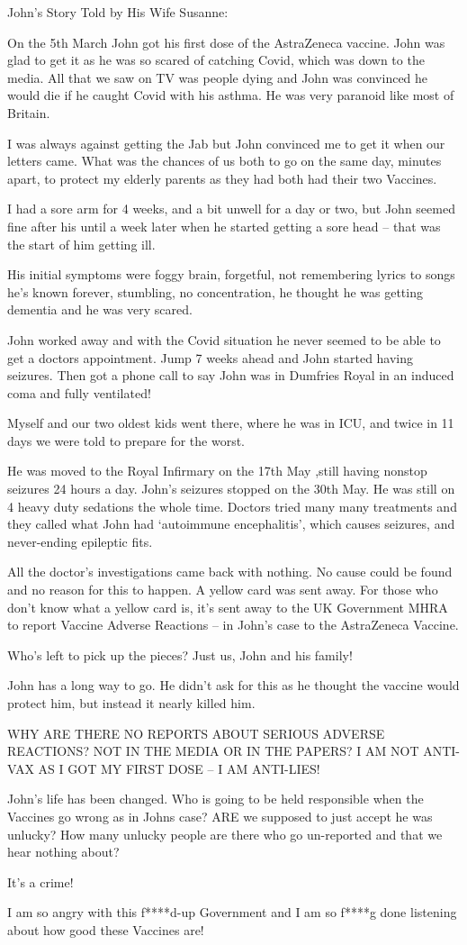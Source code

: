 John’s Story Told by His Wife Susanne:

On the 5th March John got his first dose of the AstraZeneca vaccine. John was
glad to get it as he was so scared of catching Covid, which was down to the
media. All that we saw on TV was people dying and John was convinced he would
die if he caught Covid with his asthma. He was very paranoid like most of
Britain.

I was always against getting the Jab but John convinced me to get it when our
letters came. What was the chances of us both to go on the same day, minutes
apart, to protect my elderly parents as they had both had their two Vaccines.

I had a sore arm for 4 weeks, and a bit unwell for a day or two, but John seemed
fine after his until a week later when he started getting a sore head – that was
the start of him getting ill.

His initial symptoms were foggy brain, forgetful, not remembering lyrics to
songs he’s known forever, stumbling, no concentration, he thought he was getting
dementia and he was very scared.

John worked away and with the Covid situation he never seemed to be able to get
a doctors appointment. Jump 7 weeks ahead and John started having seizures. Then
got a phone call to say John was in Dumfries Royal in an induced coma and fully
ventilated!

Myself and our two oldest kids went there, where he was in ICU, and twice in 11
days we were told to prepare for the worst.

He was moved to the Royal Infirmary on the 17th May ,still having nonstop
seizures 24 hours a day. John’s seizures stopped on the 30th May. He was still
on 4 heavy duty sedations the whole time. Doctors tried many many treatments and
they called what John had ‘autoimmune encephalitis’, which causes seizures, and
never-ending epileptic fits.

All the doctor’s investigations came back with nothing. No cause could be found
and no reason for this to happen. A yellow card was sent away. For those who
don’t know what a yellow card is, it’s sent away to the UK Government MHRA to
report Vaccine Adverse Reactions – in John’s case to the AstraZeneca Vaccine.

Who’s left to pick up the pieces? Just us, John and his family!

John has a long way to go. He didn’t ask for this as he thought the vaccine
would protect him, but instead it nearly killed him.

WHY ARE THERE NO REPORTS ABOUT SERIOUS ADVERSE REACTIONS? NOT IN THE MEDIA OR IN
THE PAPERS? I AM NOT ANTI-VAX AS I GOT MY FIRST DOSE – I AM ANTI-LIES!

John’s life has been changed. Who is going to be held responsible when the
Vaccines go wrong as in Johns case?  ARE we supposed to just accept he was
unlucky? How many unlucky people are there who go un-reported and that we hear
nothing about?

It’s a crime!

I am so angry with this f****d-up Government and I am so f****g done listening
about how good these Vaccines are!

